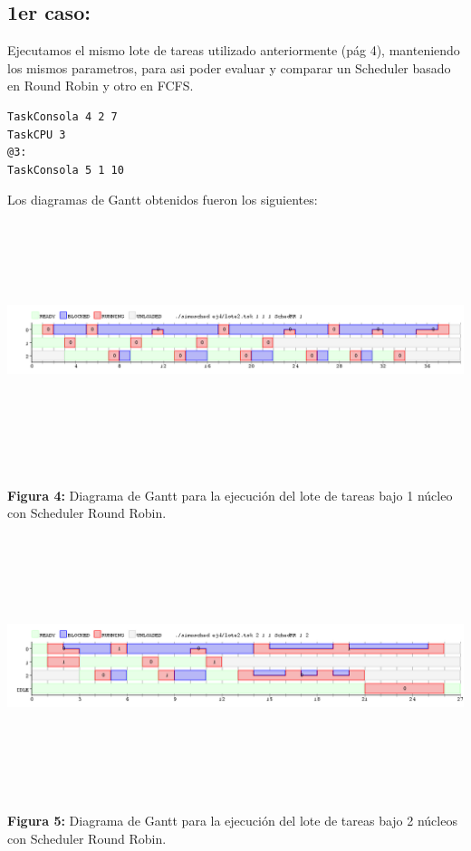 \documentclass[a4paper]{article}
\begin{document}
\subsection{1er caso:}

Ejecutamos el mismo lote de tareas utilizado anteriormente (pág 4), manteniendo los mismos parametros, para asi poder evaluar y comparar un Scheduler basado en Round Robin y otro en FCFS. 

	\begin{codesnippet}
	\begin{verbatim}
TaskConsola 4 2 7
TaskCPU 3
@3:
TaskConsola 5 1 10
	\end{verbatim}
	\end{codesnippet}

Los diagramas de Gantt obtenidos fueron los siguientes:\\


 \includegraphics[width=\textwidth,height=3.0in,keepaspectratio
]{imagenes/ej4/1core.png} \newline
\begin {flushleft}
\textbf{Figura 4:} Diagrama de Gantt para la ejecuci\'on del lote de tareas bajo 1 n\'ucleo con Scheduler Round Robin.
\end{flushleft}

  \includegraphics[width=\textwidth,height=3.0in,keepaspectratio
]{imagenes/ej4/2core.png} \newline
\begin {flushleft}
\textbf{Figura 5:} Diagrama de Gantt para la ejecuci\'on del lote de tareas bajo 2 n\'ucleos con Scheduler Round Robin.
\end{flushleft}
\end{document}
